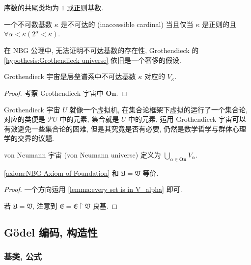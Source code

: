 \begin{corollary}
    序数的共尾类均为 \(1\) 或正则基数.
\end{corollary}

\begin{definition}
    \label {definition:inaccessible cardinal}
    一个不可数基数 \(\kappa\) 是不可达的 (inaccessible cardinal) 当且仅当 \(\kappa\) 是正则的且 \(\forall \alpha < \kappa (2^\alpha < \kappa)\).
\end{definition}

在 NBG 公理中, 无法证明不可达基数的存在性, Grothendieck 的 \ref{hypothesis:Grothendieck universe} 依旧是一个奢侈的假设.

\begin{theorem}
    Grothendieck 宇宙是层垒谱系中不可达基数 \(\kappa\) 对应的 \(V_\kappa\).

    \begin{proof}
        考察 Grothendieck 宇宙中 \(\mathbf{On}\).
    \end{proof}
\end{theorem}

Grothendieck 宇宙 \(U\) 就像一个虚拟机, 在集合论框架下虚拟的运行了一个集合论, 对应的类便是 \(\mathcal{P} U\) 中的元素, 集合就是 \(U\) 中的元素,
运用 Grothendieck 宇宙可以有效避免一些集合论的困难, 但是其究竟是否有必要, 仍然是数学哲学与群体心理学的交界的议题.

\begin{definition}
    \label {definition:von Neumann universe}
    von Neumann 宇宙 (von Neumann universe) 定义为 \(\bigcup_{\alpha \in \mathbf{On}} V_\alpha\).
\end{definition}

\begin{theorem}
    \ref{axiom:NBG Axiom of Foundation} 和 \(\mathfrak{U} = \mathfrak{V}\) 等价.

    \begin{proof}
        一个方向运用 \ref{lemma:every set is in V_alpha} 即可.

        若 \(\mathfrak{U} = \mathfrak{V}\), 注意到 \(\mathfrak{E} = \mathfrak{E} \upharpoonright \mathfrak{V}\) 良基.
    \end{proof}
\end{theorem}

\subsection{Gödel 编码, 构造性}

\subsubsection{基类, 公式}

